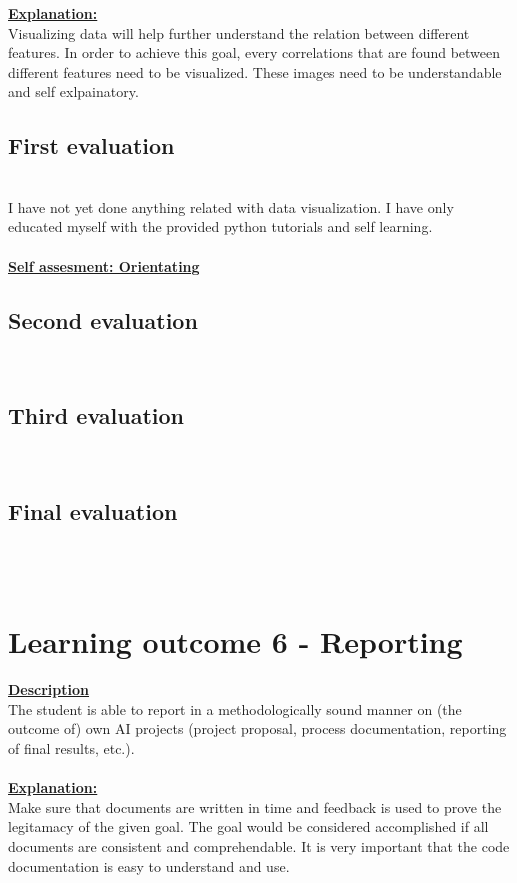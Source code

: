 \documentclass{article}
\begin{document}
\underline{\textbf{Explanation:}}\\
Visualizing data will help further understand the relation between different features. In order to achieve this goal,
every correlations that are found between different features need to be visualized. These images need to be understandable and 
self exlpainatory.
\subsection{First evaluation}\\
I have not yet done anything related with data visualization. I have only educated myself with the provided python tutorials and self learning.\\\\
\underline{\textbf{Self assesment: Orientating}}
\subsection{Second evaluation}\\
\subsection{Third evaluation}\\
\subsection{Final evaluation}\\\\
\section{Learning outcome 6 - Reporting}
\underline{\textbf{Description}}\\
The student is able to report in a methodologically sound manner on (the outcome of) 
own AI projects (project proposal, process documentation, reporting of final results, etc.).\\\\
\underline{\textbf{Explanation:}}\\
Make sure that documents are written in time and feedback is used to prove the legitamacy of the given goal. The goal would be considered 
accomplished if all documents are consistent and comprehendable. It is very important that the code documentation is easy
to understand and use.\\\\
\end{document}
